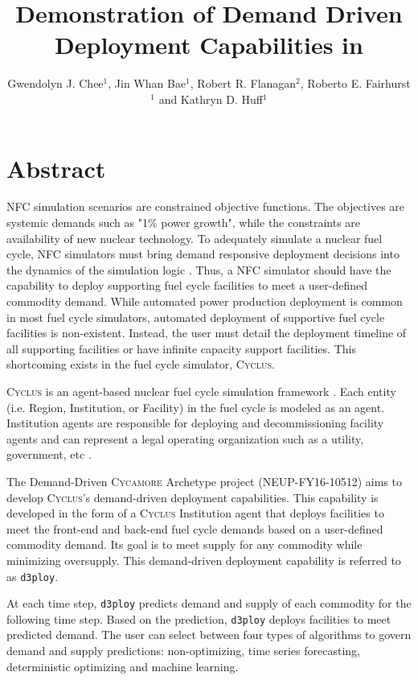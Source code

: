 \documentclass{anstrans}
\title{Demonstration of Demand Driven Deployment Capabilities in \Cyclus}
\author{Gwendolyn J. Chee$^1$, Jin Whan Bae$^1$, Robert R. Flanagan$^2$, Roberto E. Fairhurst$^1$ and Kathryn D. Huff$^1$}
\institute{
$^1$Dept. of Nuclear, Plasma and Radiological Engineering, University of Illinois at Urbana-Champaign \\
$^2$Nuclear Engineering Program, University of South Carolina \\

gchee2@illinois.edu
}
\newcommand{\Cyclus}{\textsc{Cyclus}\xspace}%
\newcommand{\Cycamore}{\textsc{Cycamore}\xspace}%
\begin{document}
\section{Abstract}
\gls{NFC} simulation scenarios are constrained objective functions. 
The objectives are systemic demands such as "1\% power growth", while the 
constraints are availability of new nuclear technology. 
To adequately simulate a nuclear fuel cycle, \gls{NFC} simulators 
must bring demand responsive deployment decisions into the dynamics of the 
simulation logic \cite{huff_current_2017}. 
Thus, a \gls{NFC} simulator should have the capability to deploy 
supporting fuel cycle facilities to meet a user-defined commodity demand. 
While automated power production deployment is common in most fuel cycle 
simulators, automated deployment of supportive fuel cycle 
facilities is non-existent. 
Instead, the user must detail the deployment timeline of all supporting 
facilities or have infinite capacity support facilities. This shortcoming 
exists in the fuel cycle simulator, \Cyclus. 

\Cyclus is an agent-based nuclear fuel cycle simulation framework 
\cite{huff_fundamental_2016}. 
Each entity (i.e. Region, Institution, or Facility) in the fuel cycle is modeled 
as an agent. 
Institution agents
are responsible for deploying and decommissioning facility agents and
can represent a legal operating organization such as a 
utility, government, etc \cite{huff_fundamental_2016}. 

The Demand-Driven \Cycamore Archetype project (NEUP-FY16-10512) aims to 
develop \Cyclus's demand-driven deployment capabilities. 
This capability is developed in the form of a \Cyclus Institution agent that 
deploys facilities to meet the front-end and back-end fuel cycle demands
based on a user-defined commodity demand. 
Its goal is to meet supply for any commodity while minimizing oversupply.
This demand-driven deployment capability is referred to as \texttt{d3ploy}. 

At each time step, \texttt{d3ploy} predicts demand and supply of each commodity for the following time step.
Based on the prediction, \texttt{d3ploy} deploys facilities to 
meet predicted demand. 
The user can select between four types of algorithms to govern demand and supply 
predictions: 
non-optimizing, time series forecasting, deterministic optimizing and machine 
learning. 
\end{document}
